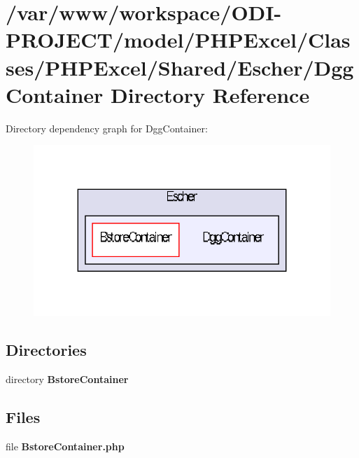 \section{/var/www/workspace/\+O\+D\+I-\/\+P\+R\+O\+J\+E\+C\+T/model/\+P\+H\+P\+Excel/\+Classes/\+P\+H\+P\+Excel/\+Shared/\+Escher/\+Dgg\+Container Directory Reference}
\label{dir_b5bbaf52ce6692b2b8af4166fcf0bbe6}
Directory dependency graph for Dgg\+Container\+:\nopagebreak
\begin{figure}[H]
\begin{center}
\leavevmode
\includegraphics[width=322pt]{dir_b5bbaf52ce6692b2b8af4166fcf0bbe6_dep}
\end{center}
\end{figure}
\subsection*{Directories}
\begin{DoxyCompactItemize}
\item 
directory {\bf Bstore\+Container}
\end{DoxyCompactItemize}
\subsection*{Files}
\begin{DoxyCompactItemize}
\item 
file {\bfseries Bstore\+Container.\+php}
\end{DoxyCompactItemize}
